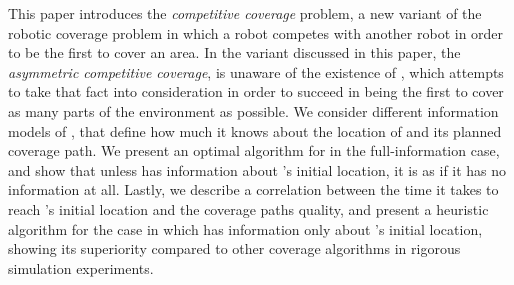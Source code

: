 This paper introduces the {\em competitive coverage} problem, a new variant of the robotic coverage problem in which a robot \rob competes with another robot \opp in order to be the first to cover an area. In the variant discussed in this paper, the {\em asymmetric competitive coverage}, \opp is unaware of the existence of \rob, which attempts to take that fact into consideration in order to succeed in being the first to cover as many parts of the environment as possible. We consider different information models of \rob, that define how much it knows about the location of \opp and its planned coverage path. We present an optimal algorithm for \rob in the full-information case, and show that unless \rob has information about \opp's initial location, it is as if it has no information at all. Lastly, we describe a correlation between the time it takes \rob to reach \opp's initial location and the coverage paths quality, and present a heuristic algorithm for the case in which \rob has information only about \opp's initial location, showing its superiority compared to other coverage algorithms in rigorous simulation experiments.